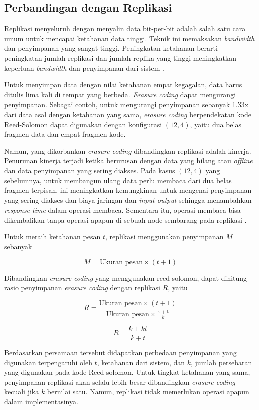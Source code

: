 \subsection{Perbandingan dengan Replikasi}
\label{sec:perbedaan-dengan-replikasi}

Replikasi menyeluruh dengan menyalin data bit-per-bit adalah salah satu cara umum untuk mencapai ketahanan data tinggi. Teknik ini memaksakan \textit{bandwidth} dan penyimpanan yang sangat tinggi. Peningkatan ketahanan berarti peningkatan jumlah replikasi dan jumlah replika yang tinggi meningkatkan keperluan \textit{bandwidth} dan penyimpanan dari sistem \parencite{weatherspoon2002erasure}.

Untuk menyimpan data dengan nilai ketahanan empat kegagalan, data harus ditulis lima kali di tempat yang berbeda. \textit{Erasure coding} dapat mengurangi penyimpanan. Sebagai contoh, untuk mengurangi penyimpanan sebanyak 1.33x dari data asal dengan ketahanan yang sama, \textit{erasure coding} berpendekatan kode Reed-Solomon dapat digunakan dengan konfigurasi $(12, 4)$, yaitu dua belas fragmen data dan empat fragmen kode.

Namun, yang dikorbankan \textit{erasure coding} dibandingkan replikasi adalah kinerja. Penurunan kinerja terjadi ketika berurusan dengan data yang hilang atau \textit{offline} dan data penyimpanan yang sering diakses. Pada kasus $(12, 4)$ yang sebelumnya, untuk membangun ulang data perlu membaca dari dua belas fragmen terpisah, ini meningkatkan kemungkinan untuk mengenai penyimpanan yang sering diakses dan biaya jaringan dan \textit{input-output} sehingga menambahkan \textit{response time} dalam operasi membaca. Sementara itu, operasi membaca bisa dikembalikan tanpa operasi apapun di sebuah node sembarang pada replikasi \parencite{huang2012erasure}.

Untuk meraih ketahanan pesan $t$, replikasi menggunakan penyimpanan $M$ sebanyak

\[M = \text{Ukuran pesan} \times (t + 1)\]

Dibandingkan \textit{erasure coding} yang menggunakan reed-solomon, dapat dihitung rasio penyimpanan \textit{erasure coding} dengan replikasi $R$, yaitu

\[R = \frac{\text{Ukuran pesan} \times (t + 1)}{\text{Ukuran pesan} \times \frac{\text{k + t}}{k}} \]


\[R = \frac{k + kt}{k + t}\]

Berdasarkan persamaan tersebut didapatkan perbedaan penyimpanan yang digunakan terpengaruhi oleh $t$, ketahanan dari sistem, dan $k$, jumlah persebaran yang digunakan pada kode Reed-solomon. Untuk tingkat ketahanan yang sama, penyimpanan replikasi akan selalu lebih besar dibandingkan \textit{erasure coding} kecuali jika $k$ bernilai satu. Namun, replikasi tidak memerlukan operasi apapun dalam implementasinya.
